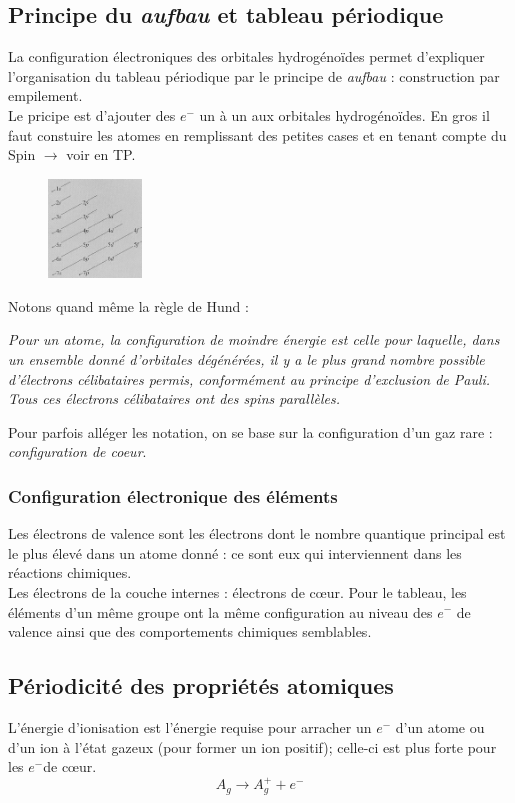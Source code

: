 \documentclass[12pt, a4paper]{article}
\begin{document}
\subsection{Principe du \textit{aufbau} et tableau périodique}
La configuration électroniques des orbitales hydrogénoïdes permet d'expliquer l'organisation du tableau périodique par le principe de \textit{aufbau} : construction par empilement.\\
Le pricipe est d'ajouter des $e^-$ un à un aux orbitales hydrogénoïdes. En gros il faut constuire les atomes en remplissant des petites cases et en tenant compte du Spin $\rightarrow$ voir en TP.\\
\begin{figure}
\includegraphics[width=2.5cm]{image6.png}
\end{figure}
Notons quand même la règle de Hund : 

\textit{Pour un atome, la configuration de moindre énergie est celle pour laquelle, dans un ensemble donné d'orbitales dégénérées, il y a le plus grand nombre possible d'électrons célibataires permis, conformément au principe d'exclusion de Pauli. Tous ces électrons célibataires ont des spins parallèles.}

Pour parfois alléger les notation, on se base sur la configuration d'un gaz rare : \textit{configuration de coeur}.

\subsubsection{Configuration électronique des éléments}
Les électrons de valence sont les électrons dont le nombre quantique principal est le plus élevé dans un atome donné : ce sont eux qui interviennent dans les réactions chimiques.\\
Les électrons de la couche internes : électrons de cœur. Pour le tableau, les éléments d'un même groupe ont la même configuration au niveau des $e^-$ de valence ainsi que des comportements chimiques semblables.

\subsection{Périodicité des propriétés atomiques}
L'énergie d'ionisation est l'énergie requise pour arracher un $e^-$ d'un atome ou d'un ion à l'état gazeux  (pour former un ion positif); celle-ci est plus forte pour les $e^-$de cœur.
$$A_g \rightarrow A_g^+ + e^-$$
\end{document}
